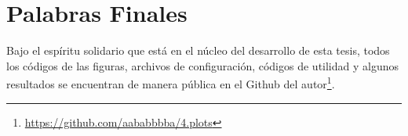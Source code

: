 \section{Palabras Finales}
Bajo el espíritu solidario que está en el núcleo del desarrollo de esta tesis, todos los códigos de las figuras, archivos de configuración, códigos de utilidad y algunos resultados se encuentran de manera pública en el Github del autor\footnote{\url{https://github.com/aababbbba/4.plots}}.
